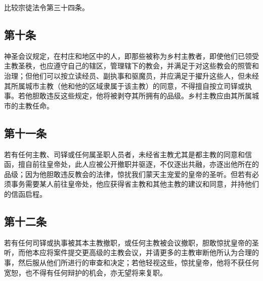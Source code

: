 比较宗徒法令第三十四条。\par


\subsection{第十条}

神圣会议规定，在村庄和地区中的人，即那些被称为乡村主教者，即使他们已领受主教圣秩，也应遵守自己的辖区，管理辖下的教会，并满足于对这些教会的照管和治理；但他们可以按立读经员、副执事和驱魔员，并应满足于擢升这些人，但未经其所属城市主教（他和他的区域隶属于该主教）的同意，不得擅自按立司铎或执事。若他胆敢违反这些规定，他将被剥夺其所拥有的品级。乡村主教应由其所属城市的主教任命。\par


\subsection{第十一条}

若有任何主教、司铎或任何属圣职人员者，未经省主教尤其是都主教的同意和信函，擅自前往皇帝处，此人应被公开撤职并驱逐，不仅逐出共融，亦逐出他所在的品级；因为他胆敢违反教会的法律，惊扰我们蒙天主宠爱的皇帝的圣听。但若有必须事务需要某人前往皇帝处，他应获得省主教和其他主教的建议和同意，并持他们的信函启程。\par

\par


\subsection{第十二条}

若有任何司铎或执事被其本主教撤职，或任何主教被会议撤职，胆敢惊扰皇帝的圣听，而他本应将案件提交更高级的主教会议，并请更多的主教审断他所认为合理的事，然后服从他们所进行的审查和决定；若他轻视这些，惊扰皇帝，他将不获任何宽恕，也不得有任何辩护的机会，亦无望将来复职。\par

